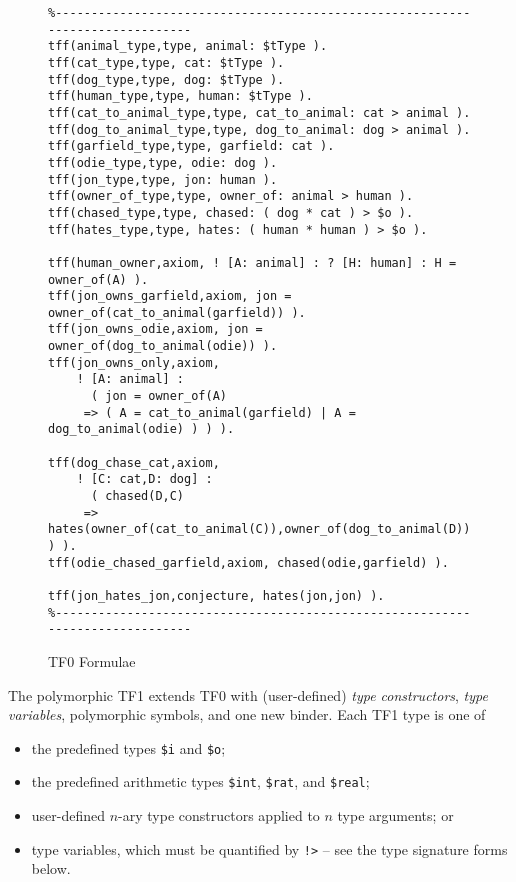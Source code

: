 \documentclass{easychair}
\begin{document}
\begin{figure}[htbp]
\begin{small}
\begin{verbatim}
%------------------------------------------------------------------------------
tff(animal_type,type, animal: $tType ).
tff(cat_type,type, cat: $tType ).
tff(dog_type,type, dog: $tType ).
tff(human_type,type, human: $tType ).
tff(cat_to_animal_type,type, cat_to_animal: cat > animal ).
tff(dog_to_animal_type,type, dog_to_animal: dog > animal ).
tff(garfield_type,type, garfield: cat ).
tff(odie_type,type, odie: dog ).
tff(jon_type,type, jon: human ).
tff(owner_of_type,type, owner_of: animal > human ).
tff(chased_type,type, chased: ( dog * cat ) > $o ).
tff(hates_type,type, hates: ( human * human ) > $o ).

tff(human_owner,axiom, ! [A: animal] : ? [H: human] : H = owner_of(A) ).
tff(jon_owns_garfield,axiom, jon = owner_of(cat_to_animal(garfield)) ).
tff(jon_owns_odie,axiom, jon = owner_of(dog_to_animal(odie)) ).
tff(jon_owns_only,axiom,
    ! [A: animal] :
      ( jon = owner_of(A)
     => ( A = cat_to_animal(garfield) | A = dog_to_animal(odie) ) ) ).

tff(dog_chase_cat,axiom,
    ! [C: cat,D: dog] :
      ( chased(D,C)
     => hates(owner_of(cat_to_animal(C)),owner_of(dog_to_animal(D))) ) ).
tff(odie_chased_garfield,axiom, chased(odie,garfield) ).

tff(jon_hates_jon,conjecture, hates(jon,jon) ).
%------------------------------------------------------------------------------
\end{verbatim}
\end{small}
\caption{TF0 Formulae}
\label{TF0Example}
\end{figure}

The polymorphic TF1 extends TF0 with (user-defined) {\em type constructors}, 
{\em type variables}, polymorphic symbols, and one new binder.
Each TF1 type is one of
\begin{itemize}
\item the predefined types {\tt \$i} and {\tt \$o};
\item the predefined arithmetic types {\tt \$int}, {\tt \$rat}, and 
      {\tt \$real};
\item user-defined $n$-ary type constructors applied to $n$ type arguments; or
\item type variables, which must be quantified by {\tt !>} -- see the type
      signature forms below.
\end{itemize}
\end{document}
